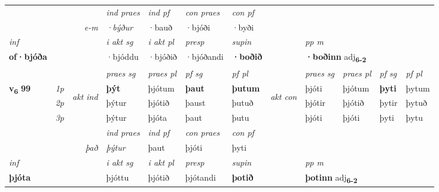 \begin{longtable}[l]{X>{\footnotesize\itshape}llXXXXlXXXX}
   && &  \textit{ind praes} & \textit{ind pf} & \textit{con praes} & \textit{con pf} \\*
\multicolumn{3}{r}{\textit{e-m}} & ·býður & ·bauð & ·bjóði & ·byði \\*

\cmidrule{4-7}
   {\textit{inf}} & &  & \textit{i akt sg} & \textit{i akt pl}   & \textit{presp} & \textit{supin}  && \textit{pp m} \\*
  {\textbf{of\allowbreak ·bjóða}} & && ·bjóddu  & ·bjóðið   & ·bjóðandi &  \textbf{·boðið}  && \multicolumn{2}{l}{\textbf{·boðinn} adj\textbf{\textsubscript{6-2}}} \\*

\midrule

 & &   & \textit{praes sg}  & \textit{praes pl}    & \textit{ pf sg} & \textit{pf pl} & & \textit{praes sg}  & \textit{praes pl}    & \textit{pf sg} & \textit{pf pl }  \\ \cmidrule{4-7} \cmidrule{9-12}
 \multirow{2}{*}{{{\textbf{v{\textsubscript{6}}} \Large{\textbf{99}}}}}  & 1p & \multirow{3}{*}{\begin{turn}{90}\textit{akt ind}\end{turn}} & \textbf{þýt} & þjótum & \textbf{þaut} & \textbf{þutum} & \multirow{3}{*}{\begin{turn}{90}\textit{akt con}\end{turn}} &þjóti & þjótum & \textbf{þyti} & þytum\\*
 & 2p &  &  þýtur  & þjótið & þaust & þutuð & & þjótir & þjótið & þytir & þytuð \\*
 & 3p &  & þýtur & þjóta & þaut & þutu & & þjóti & þjóti& þyti & þytu \\*
\cmidrule{4-7} \cmidrule{9-12}

   && &  \textit{ind praes} & \textit{ind pf} & \textit{con praes} & \textit{con pf} \\*
\multicolumn{3}{r}{\textit{það}} & þýtur & þaut & þjóti & þyti \\*

\cmidrule{4-7}
   {\textit{inf}} & &  & \textit{i akt sg} & \textit{i akt pl}   & \textit{presp} & \textit{supin}  && \textit{pp m} \\*
  {\textbf{þjóta}} & && þjóttu  & þjótið   & þjótandi &  \textbf{þotið}  && \multicolumn{2}{l}{\textbf{þotinn} adj\textbf{\textsubscript{6-2}}} \\*

\midrule


\end{longtable}
